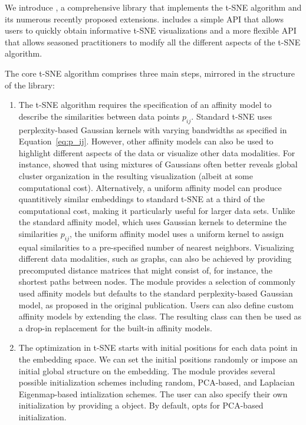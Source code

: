\documentclass[article]{jss}
\newcommand{\opentsne}{\pkg{openTSNE}\xspace}
\begin{document}
We introduce \opentsne, a comprehensive  library that implements the t-SNE algorithm and its numerous recently proposed extensions. \opentsne includes a simple API that allows users to quickly obtain informative t-SNE visualizations and a more flexible API that allows seasoned practitioners to modify all the different aspects of the t-SNE algorithm.

The core t-SNE algorithm comprises three main steps, mirrored in the structure of the \opentsne library:

\begin{enumerate}
\item The t-SNE algorithm requires the specification of an affinity model to describe the similarities between data points $p_{ij}$. Standard t-SNE uses perplexity-based Gaussian kernels with varying bandwidths as specified in Equation~\ref{eq:p_ij}. However, other affinity models can also be used to highlight different aspects of the data or visualize other data modalities. For instance, \citet{kobak2019art} showed that using mixtures of Gaussians often better reveals global cluster organization in the resulting visualization (albeit at some computational cost). Alternatively, a uniform affinity model can produce quantitively similar embeddings to standard t-SNE at a third of the computational cost, making it particularly useful for larger data sets. Unlike the standard affinity model, which uses Gaussian kernels to determine the similarities $p_{ij}$, the uniform affinity model uses a uniform kernel to assign equal similarities to a pre-specified number of nearest neighbors. Visualizing different data modalities, such as graphs, can also be achieved by providing precomputed distance matrices that might consist of, for instance, the shortest paths between nodes. The  module provides a selection of commonly used affinity models but defaults to the standard perplexity-based Gaussian model, as proposed in the original publication. Users can also define custom affinity models by extending the  class. The resulting class can then be used as a drop-in replacement for the built-in affinity models.

\item The optimization in t-SNE starts with initial positions for each data point in the embedding space. We can set the initial positions randomly or impose an initial global structure on the embedding. %
The  module provides several possible initialization schemes including random, PCA-based, and Laplacian Eigenmap-based intialization schemes. The user can also specify their own initialization by providing a  object. By default, \opentsne opts for PCA-based initialization.


\end{enumerate}
\end{document}
